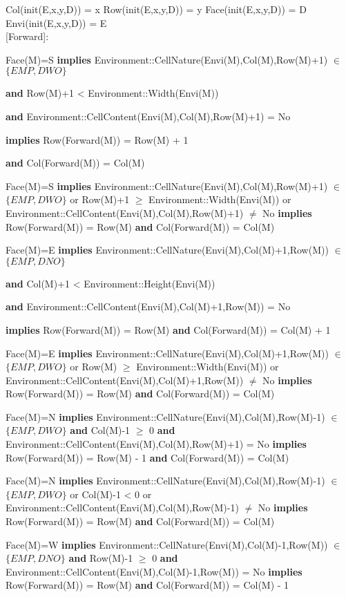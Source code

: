 \documentclass[11pt]{article}
\begin{document}
Col(init(E,x,y,D)) = x
Row(init(E,x,y,D)) = y
Face(init(E,x,y,D)) = D
Envi(init(E,x,y,D)) = E\\

[Forward]:

Face(M)=S \textbf{implies} Environment::CellNature(Envi(M),Col(M),Row(M)+1) $\in$ $\{EMP, DWO\}$

\textbf{and} Row(M)+1 < Environment::Width(Envi(M))

\textbf{and} Environment::CellContent(Envi(M),Col(M),Row(M)+1) = No

\textbf{implies} Row(Forward(M)) = Row(M) + 1

\textbf{and} Col(Forward(M)) = Col(M) 

Face(M)=S \textbf{implies}
Environment::CellNature(Envi(M),Col(M),Row(M)+1) $\in$  $\{EMP, DWO\}$
or Row(M)+1 $\geq$ Environment::Width(Envi(M)) or Environment::CellContent(Envi(M),Col(M),Row(M)+1) $\neq$ No \textbf{implies} Row(Forward(M)) = Row(M) \textbf{and} Col(Forward(M)) = Col(M)

Face(M)=E \textbf{implies}
Environment::CellNature(Envi(M),Col(M)+1,Row(M)) $\in$ $\{EMP, DNO\}$

\textbf{and} Col(M)+1 < Environment::Height(Envi(M))

\textbf{and} Environment::CellContent(Envi(M),Col(M)+1,Row(M)) = No

\textbf{implies} Row(Forward(M)) = Row(M) \textbf{and} Col(Forward(M)) = Col(M) + 1

Face(M)=E \textbf{implies}
Environment::CellNature(Envi(M),Col(M)+1,Row(M)) $\in$ $\{EMP, DWO\}$
or Row(M) $\geq$ Environment::Width(Envi(M))
or Environment::CellContent(Envi(M),Col(M)+1,Row(M)) $\neq$ No
\textbf{implies} Row(Forward(M)) = Row(M)
\textbf{and} Col(Forward(M)) = Col(M)

Face(M)=N \textbf{implies} Environment::CellNature(Envi(M),Col(M),Row(M)-1) $\in$ $\{EMP, DWO\}$
\textbf{and} Col(M)-1 $\geq$ 0
\textbf{and} Environment::CellContent(Envi(M),Col(M),Row(M)+1) = No
\textbf{implies} Row(Forward(M)) = Row(M) - 1
\textbf{and} Col(Forward(M)) = Col(M)


Face(M)=N \textbf{implies}
Environment::CellNature(Envi(M),Col(M),Row(M)-1) $\in$
$\{EMP, DWO\}$ or Col(M)-1 < 0 or Environment::CellContent(Envi(M),Col(M),Row(M)-1) $\neq$ No
\textbf{implies} Row(Forward(M)) = Row(M)
\textbf{and} Col(Forward(M)) = Col(M)

Face(M)=W \textbf{implies} Environment::CellNature(Envi(M),Col(M)-1,Row(M)) $\in$ $\{EMP, DNO\}$
\textbf{and} Row(M)-1 $\geq$ 0
\textbf{and} Environment::CellContent(Envi(M),Col(M)-1,Row(M)) = No
\textbf{implies} Row(Forward(M)) = Row(M)
\textbf{and} Col(Forward(M)) = Col(M) - 1
\end{document}
